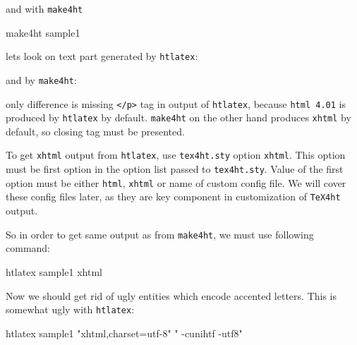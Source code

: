 and with \texttt{make4ht}

\begin{shellcommand}
make4ht sample1
\end{shellcommand}

lets look on text part generated by \texttt{htlatex}:


and by \texttt{make4ht}:


only difference is missing \texttt{\textless{}/p\textgreater{}} tag in
output of \texttt{htlatex}, because \texttt{html\ 4.01} is produced by
\texttt{htlatex} by default. \texttt{make4ht} on the other hand produces
\texttt{xhtml} by default, so closing tag must be presented.

To get \texttt{xhtml} output from \texttt{htlatex}, use
\texttt{tex4ht.sty} option \texttt{xhtml}. This option must be first
option in the option list passed to \texttt{tex4ht.sty}. Value of the
first option must be either \texttt{html}, \texttt{xhtml} or name of
custom config file. We will cover these config files later, as they are
key component in customization of \texttt{TeX4ht} output.

So in order to get same output as from \texttt{make4ht}, we must use
following command:

\begin{shellcommand}
htlatex sample1 xhtml
\end{shellcommand}

Now we should get rid of ugly entities which encode accented letters.
This is somewhat ugly with \texttt{htlatex}:

\begin{shellcommand}
htlatex sample1 "xhtml,charset=utf-8" " -cunihtf -utf8"
\end{shellcommand}

